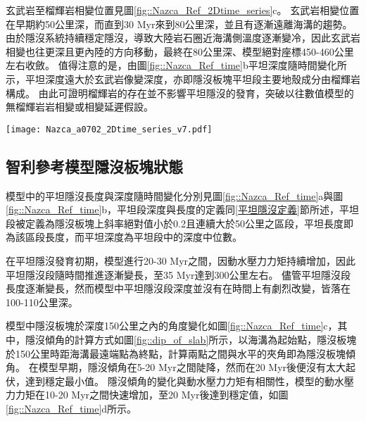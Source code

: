 玄武岩至榴輝岩相變位置見圖\ref{fig::Nazca_Ref_2Dtime_series}c。
玄武岩相變位置在早期約50公里深，而直到30 Myr來到80公里深，並且有逐漸遠離海溝的趨勢。
由於隱沒系統持續穩定隱沒，導致大陸岩石圈近海溝側溫度逐漸變冷，因此玄武岩相變也往更深且更內陸的方向移動，最終在80公里深、模型絕對座標450-460公里左右收斂。
值得注意的是，由圖\ref{fig::Nazca_Ref_time}b平坦深度隨時間變化所示，平坦深度遠大於玄武岩像變深度，亦即隱沒板塊平坦段主要地殼成分由榴輝岩構成。
由此可證明榴輝岩的存在並不影響平坦隱沒的發育，突破以往數值模型的無榴輝岩岩相變或相變延遲假設。
\begin{figure*}[ht!]
    \centering
    \texttt{[image: Nazca\_a0702\_2Dtime\_series\_v7.pdf]}
    \caption[智利參考模型部分熔融、岩漿庫與玄武岩相變時空關係圖]{智利參考模型部分熔融、岩漿庫與玄武岩相變位置時空關係圖。(a)圓點為智利參考模型於時間軸上部分熔融發生網格位置，圓點顏色代表時間，僅包含網格中熔融比例大於千分之一的網格。線條為每10 Myr的隱沒板塊頂部介面，分別為10 Myr、20 Myr、30 Myr與40 Myr，橫軸上方標示出模型於40 Myr的相對海溝距離。(b)圓點為智利參考模型於時間軸上岩漿庫網格位置，圓點顏色代表時間，僅繪出網格中岩漿比例大於萬分之一的網格。線條為每10 Myr的隱沒板塊頂部介面，分別為10 Myr、20 Myr、30 Myr與40 Myr，橫軸上方標示出模型於40 Myr的相對海溝距離。藍細線標示出兩個岩漿庫集中區寬度範圍，並分別在橘色方框中標出文中說明的岩漿庫區名稱。(c)圓點為智利參考模型於時間軸上之玄武岩相變位置變化圖，圓點顏色代表時間。}
    \label{fig::Nazca_Ref_2Dtime_series}
\end{figure*}

\subsection{智利參考模型隱沒板塊狀態}
模型中的平坦隱沒長度與深度隨時間變化分別見圖\ref{fig::Nazca_Ref_time}a與圖\ref{fig::Nazca_Ref_time}b，平坦段深度與長度的定義同\ref{平坦隱沒定義}節所述，平坦段被定義為隱沒板塊上斜率絕對值小於0.2且連續大於50公里之區段，平坦長度即為該區段長度，而平坦深度為平坦段中的深度中位數。

在平坦隱沒發育初期，模型進行20-30 Myr之間，因動水壓力力矩持續增加，因此平坦隱沒段隨時間推進逐漸變長，至35 Myr達到300公里左右。
儘管平坦隱沒段長度逐漸變長，然而模型中平坦隱沒段深度並沒有在時間上有劇烈改變，皆落在100-110公里深。

模型中隱沒板塊於深度150公里之內的角度變化如圖\ref{fig::Nazca_Ref_time}c，其中，隱沒傾角的計算方式如圖\ref{fig::dip_of_slab}所示，以海溝為起始點，隱沒板塊於150公里時距海溝最遠端點為終點，計算兩點之間與水平的夾角即為隱沒板塊傾角。
在模型早期，隱沒傾角在5-20 Myr之間陡降，然而在20 Myr後便沒有太大起伏，達到穩定最小值。
隱沒傾角的變化與動水壓力力矩有相關性，模型的動水壓力力矩在10-20 Myr之間快速增加，至20 Myr後達到穩定值，如圖\ref{fig::Nazca_Ref_time}d所示。

